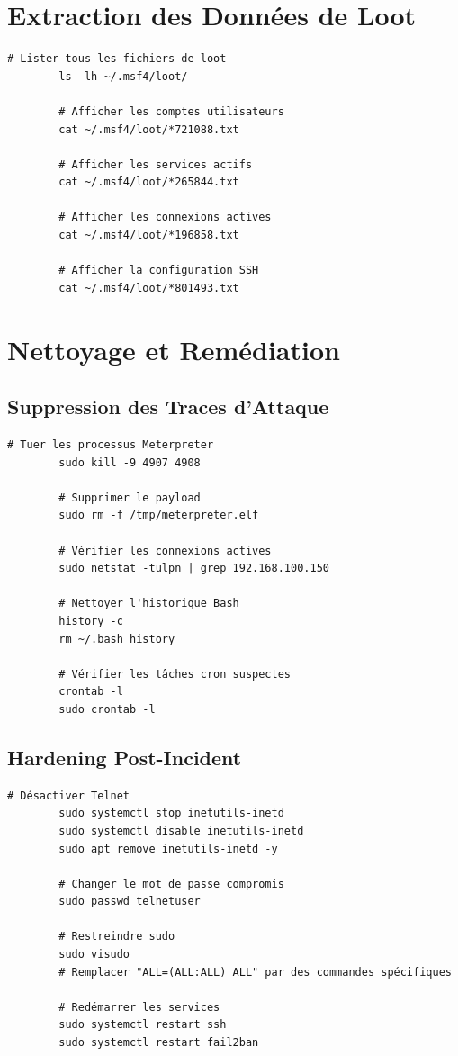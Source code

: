 \documentclass[12pt,a4paper,openany]{report}
\begin{document}
	\section{Extraction des Données de Loot}
	
	\begin{lstlisting}[caption=Consultation des Fichiers de Loot]
		# Lister tous les fichiers de loot
		ls -lh ~/.msf4/loot/
		
		# Afficher les comptes utilisateurs
		cat ~/.msf4/loot/*721088.txt
		
		# Afficher les services actifs
		cat ~/.msf4/loot/*265844.txt
		
		# Afficher les connexions actives
		cat ~/.msf4/loot/*196858.txt
		
		# Afficher la configuration SSH
		cat ~/.msf4/loot/*801493.txt
	\end{lstlisting}
	
	\section{Nettoyage et Remédiation}
	
	\subsection{Suppression des Traces d'Attaque}
	\begin{lstlisting}[caption=Commandes de Nettoyage sur la Cible]
		# Tuer les processus Meterpreter
		sudo kill -9 4907 4908
		
		# Supprimer le payload
		sudo rm -f /tmp/meterpreter.elf
		
		# Vérifier les connexions actives
		sudo netstat -tulpn | grep 192.168.100.150
		
		# Nettoyer l'historique Bash
		history -c
		rm ~/.bash_history
		
		# Vérifier les tâches cron suspectes
		crontab -l
		sudo crontab -l
	\end{lstlisting}
	
	\subsection{Hardening Post-Incident}
	\begin{lstlisting}[caption=Mesures de Durcissement Immédiates]
		# Désactiver Telnet
		sudo systemctl stop inetutils-inetd
		sudo systemctl disable inetutils-inetd
		sudo apt remove inetutils-inetd -y
		
		# Changer le mot de passe compromis
		sudo passwd telnetuser
		
		# Restreindre sudo
		sudo visudo
		# Remplacer "ALL=(ALL:ALL) ALL" par des commandes spécifiques
		
		# Redémarrer les services
		sudo systemctl restart ssh
		sudo systemctl restart fail2ban
	\end{lstlisting}
	
\end{document}
